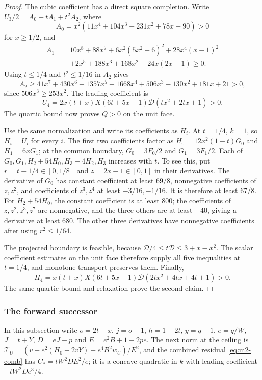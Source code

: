 \begin{proof}
The cubic coefficient has a direct square completion. Write
$U_3/2=A_0+tA_1+t^2A_2$, where
\[
 A_0=x^2(11x^4+104x^3+231x^2+78x-90)>0
\]
for $x\ge1/2$, and
\begin{align*}
 A_1={}&10x^8+88x^7+6x^2(5x^2-6)^2+28x^4(x-1)^2\\
       &+2x^5+188x^3+168x^2+24x(2x-1)\ge0.
\end{align*}
Using $t\le1/4$ and $t^2\le1/16$ in $A_2$ gives
\[
 A_2\ge41x^7+430x^6+1357x^5+1668x^4
                 +506x^3-130x^2+181x+21>0,
\]
since $506x^3\ge253x^2$.
The leading coefficient is
\[
 U_4=2x(t+x)X(6t+5x-1)\mathcal D(tx^2+2tx+1)>0.
\]
The quartic bound now proves $Q>0$ on the unit face.

Use the same normalization and write its coefficients as $H_i$.
At $t=1/4$, $k=1$, so $H_i=U_i$ for every $i$.
The first two coefficients factor as
$H_0=12x^2(1-t)G_0$ and $H_1=6xG_1$; at the common boundary,
$G_0=3F_0/2$ and $G_1=3F_1/2$.
Each of $G_0,G_1,H_2+54H_0,H_3+4H_2,H_3$ increases with $t$.
To see this, put $r=t-1/4\in[0,1/8]$ and $z=2x-1\in[0,1]$ in their derivatives.
The derivative of $G_0$ has constant coefficient at least $69/8$, nonnegative
coefficients of $z,z^2$, and coefficients of $z^3,z^4$ at least $-3/16,-1/16$.
It is therefore at least $67/8$.
For $H_2+54H_0$, the constant coefficient is at least $800$;
the coefficients of $z,z^2,z^3,z^7$ are nonnegative, and the three others
are at least $-40$, giving a derivative at least $680$.
The other three derivatives have nonnegative coefficients after using $r^2\le1/64$.

The projected boundary is feasible, because
$\mathcal D/4\le t\mathcal D\le3+x-x^2$.
The scalar coefficient estimates on the unit face therefore supply all five inequalities at $t=1/4$,
and monotone transport preserves them.
Finally,
\[
 H_4=x(t+x)X(6t+5x-1)\mathcal D(2tx^2+4tx+4t+1)>0.
\]
The same quartic bound and relaxation prove the second claim.
\end{proof}

\subsubsection{The forward successor}\label{app:m2-forward-signs}

In this subsection write $o=2t+x$, $j=o-1$, $h=1-2t$, $y=q-1$, $e=q/W$, $J=t+Y$, $D=eJ-p$ and
$E=e^2B+1-2pe$. The next norm at the ceiling is $\mathcal T_U=(v-e^2(H_0+2vY)+e^4B^2w_U)/E^2$, and
the combined residual \eqref{eq:m2-comb} has $C_*=tW^2DE^2/e$; it is a concave quadratic in $k$
with leading coefficient $-tW^2De^3/4$.

